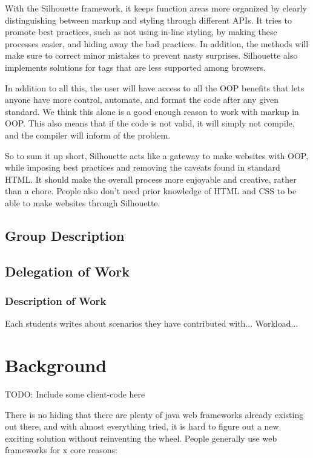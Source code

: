 \documentclass[12pt]{article}
\begin{document}
With the Silhouette framework, it keeps function areas more organized by clearly distinguishing between markup and styling through different APIs. It tries to promote best practices, such as not using in-line styling, by making these processes easier, and hiding away the bad practices. In addition, the methods will make sure to correct minor mistakes to prevent nasty surprises. Silhouette also implements solutions for tags that are less supported among browsers. 

In addition to all this, the user will have access to all the OOP benefits that lets anyone have more control, automate, and format the code after any given standard. We think this alone is a good enough reason to work with markup in OOP. This also means that if the code is not valid, it will simply not compile, and the compiler will inform of the problem.

So to sum it up short, Silhouette acts like a gateway to make websites with OOP, while imposing best practices and removing the caveats found in standard HTML. It should make the overall process more enjoyable and creative, rather than a chore. People also don't need prior knowledge of HTML and CSS to be able to make websites through Silhouette.

\subsection{Group Description}

    \subsection{Delegation of Work}

    \subsubsection{Description of Work}
    Each students writes about scenarios they have contributed with...
    Workload...

\section{Background}
TODO: Include some client-code here

There is no hiding that there are plenty of java web frameworks already existing out there, and with almost everything tried, it is hard to figure out a new exciting solution without reinventing the wheel. People generally use web frameworks for x core reasons:
\end{document}

